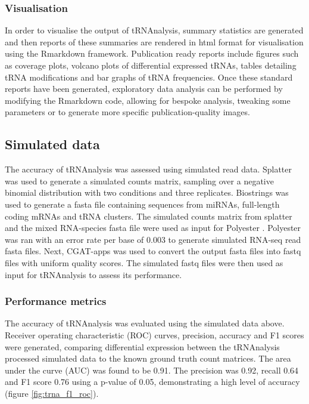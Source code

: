 \subsubsection{Visualisation}
In order to visualise the output of tRNAnalysis, summary statistics are generated and then reports of these summaries are rendered in html format for visualisation using the Rmarkdown framework.
Publication ready reports include figures such as coverage plots, volcano plots of differential expressed tRNAs, tables detailing tRNA modifications and bar graphs of tRNA frequencies.
Once these standard reports have been generated, exploratory data analysis can be performed by modifying the Rmarkdown code, allowing for bespoke analysis, tweaking some parameters or to generate more specific publication-quality images.

\subsection{Simulated data}
The accuracy of tRNAnalysis was assessed using simulated read data.
Splatter \cite{zappia2017splatter} was used to generate a simulated counts matrix, sampling over a negative binomial distribution with two conditions and three replicates.
Biostrings \cite{pages2013package} was used to generate a fasta file containing sequences from miRNAs, full-length coding mRNAs and tRNA clusters.
The simulated counts matrix from splatter and the mixed RNA-species fasta file were used as input for Polyester \cite{frazee2015polyester}.
Polyester was ran with an error rate per base of 0.003 to generate simulated RNA-seq read fasta files.
Next, CGAT-apps \cite{sims2014cgat} was used to convert the output fasta files into fastq files with uniform quality scores.
The simulated fastq files were then used as input for tRNAnalysis to assess its performance.

\subsubsection{Performance metrics}
The accuracy of tRNAnalysis was evaluated using the simulated data above.
Receiver operating characteristic (ROC) curves, precision, accuracy and F1 scores were generated, comparing differential expression between the tRNAnalysis processed simulated data to the known ground truth count matrices.
The area under the curve (AUC) was found to be 0.91.
The precision was 0.92, recall 0.64 and F1 score 0.76 using a p-value of 0.05, demonstrating a high level of accuracy (figure \ref{fig:trna_f1_roc}).

